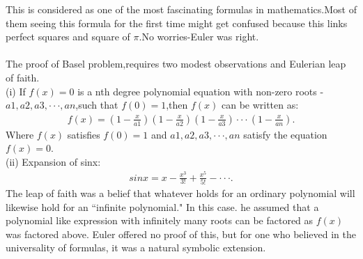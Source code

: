 \documentclass[a4paper,reqno,11pt]{book}
\theoremstyle{plain}%
\theoremstyle{definition}
\begin{document}
This is considered as one of the most fascinating formulas in mathematics.Most of them seeing this formula for the first time might get confused because this links perfect squares and square of $\pi$.No worries-Euler was right.\\
\\
The proof of Basel problem,requires two modest observations and Eulerian leap of faith.\\
(i) If $f(x)=0$ is a nth degree polynomial equation with non-zero roots - $a1,a2,a3,\cdot\cdot\cdot,an$,such that $f(0)=1$,then $f(x)$ can be written as:\\
\begin{eqnarray*}
    f(x)=\left(1-\frac{x}{a1}\right)\left(1-\frac{x}{a2}\right)\left(1-\frac{x}{a3}\right)\cdot\cdot\cdot\left(1-\frac{x}{an}\right).
\end{eqnarray*}
Where $f(x)$ satisfies $f(0)=1$ and $a1,a2,a3,\cdot\cdot\cdot,an$ satisfy the equation $f(x)=0$.\\
(ii) Expansion of sinx:
\begin{eqnarray*}
    sinx=x-\frac{x^3}{3!}+\frac{x^5}{5!}-\cdot\cdot\cdot.
\end{eqnarray*}
The leap of faith was a belief that whatever holds for an ordinary polynomial will likewise hold for an ``infinite polynomial." In this case. he assumed that a polynomial like expression with infinitely many roots can be factored as $f(x)$ was factored above. Euler offered no proof of this, but for one who believed in the universality of formulas, it was a natural symbolic extension.\cite{ref8}
\end{document}
